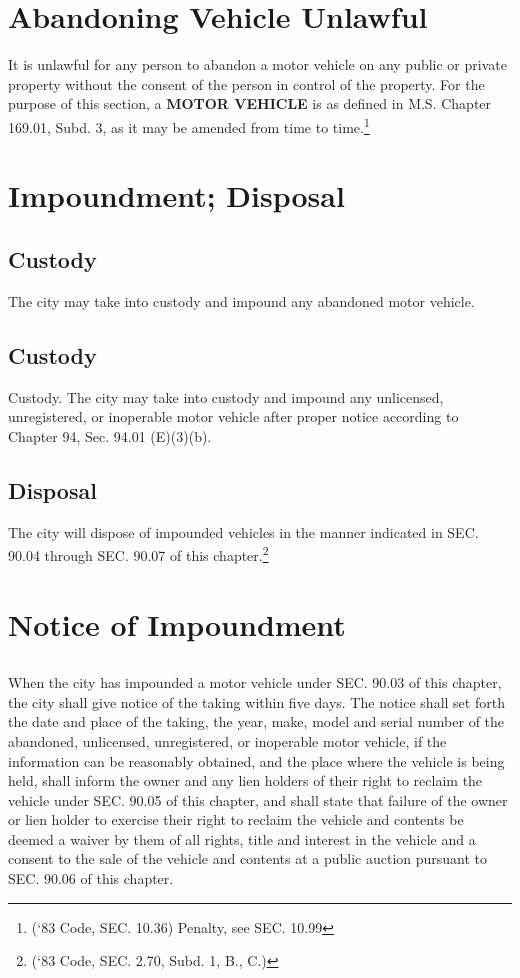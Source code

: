 \section{Abandoning Vehicle Unlawful}
It is unlawful for any person to abandon a motor vehicle on any public or private property without the consent of the person in control of the property.  For the purpose of this section, a \textbf{MOTOR VEHICLE} is as defined in M.S. Chapter 169.01, Subd. 3, as it may be amended from time to time.\footnote{(‘83 Code, SEC. 10.36)  Penalty, see SEC. 10.99}

\section{Impoundment; Disposal}
\subsection{Custody}
The city may take into custody and impound any abandoned motor vehicle.
\subsection{Custody}
Custody.  The city may take into custody and impound any unlicensed, unregistered, or inoperable motor vehicle after proper notice according to Chapter 94, Sec. 94.01 (E)(3)(b).
\subsection{Disposal}
The city will dispose of impounded vehicles in the manner indicated in SEC. 90.04 through SEC. 90.07 of this chapter.\footnote{(‘83 Code, SEC. 2.70, Subd. 1, B., C.)}

\section{Notice of Impoundment}
\subsection{}
When the city has impounded a motor vehicle under SEC. 90.03 of this chapter, the city shall give notice of the taking within five days.  The notice shall set forth the date and place of the taking, the year, make, model and serial number of the abandoned, unlicensed, unregistered, or inoperable motor vehicle, if the information can be reasonably obtained, and the place where the vehicle is being held, shall inform the owner and any lien holders of their right to reclaim the vehicle under SEC. 90.05 of this chapter, and shall state that failure of the owner or lien holder to exercise their right to reclaim the vehicle and contents be deemed a waiver by them of all rights, title and interest in the vehicle and a consent to the sale of the vehicle and contents at a public auction pursuant to SEC. 90.06 of this chapter.
